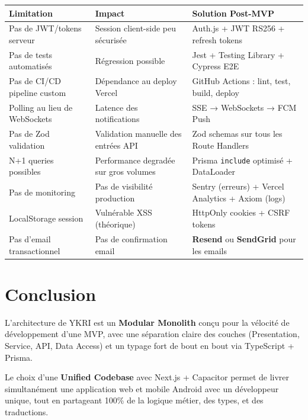 \documentclass[12pt, a4paper]{article}
\begin{document}
\begin{enumerate}[leftmargin=2em, label=\textbf{Q\arabic*.}]
\begin{table}[h!]
\centering
\begin{tabularx}{\textwidth}{l X X}
\toprule
\textbf{Limitation} & \textbf{Impact} & \textbf{Solution Post-MVP} \\
\midrule
Pas de JWT/tokens serveur & Session client-side peu sécurisée & Auth.js + JWT RS256 + refresh tokens \\
Pas de tests automatisés & Régression possible & Jest + Testing Library + Cypress E2E \\
Pas de CI/CD pipeline custom & Dépendance au deploy Vercel & GitHub Actions : lint, test, build, deploy \\
Polling au lieu de WebSockets & Latence des notifications & SSE → WebSockets → FCM Push \\
Pas de Zod validation & Validation manuelle des entrées API & Zod schemas sur tous les Route Handlers \\
N+1 queries possibles & Performance degradée sur gros volumes & Prisma \texttt{include} optimisé + DataLoader \\
Pas de monitoring & Pas de visibilité production & Sentry (erreurs) + Vercel Analytics + Axiom (logs) \\
LocalStorage session & Vulnérable XSS (théorique) & HttpOnly cookies + CSRF tokens \\
Pas d'email transactionnel & Pas de confirmation email & \textbf{Resend} ou \textbf{SendGrid} pour les emails \\
\bottomrule
\end{tabularx}
\end{table}

\end{enumerate}

\section{Conclusion}

L'architecture de YKRI est un \textbf{Modular Monolith} conçu pour la vélocité de développement d'une MVP, avec une séparation claire des couches (Presentation, Service, API, Data Access) et un typage fort de bout en bout via TypeScript + Prisma.

Le choix d'une \textbf{Unified Codebase} avec Next.js + Capacitor permet de livrer simultanément une application web et mobile Android avec un développeur unique, tout en partageant 100\% de la logique métier, des types, et des traductions.
\end{document}
